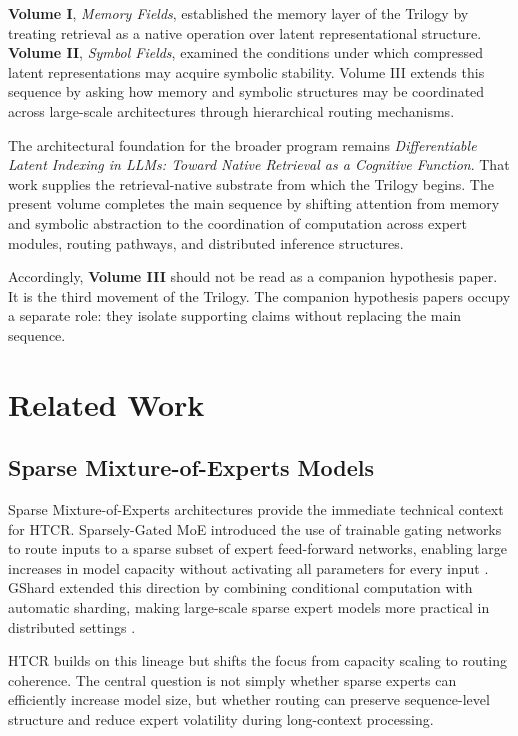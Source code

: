 \textbf{Volume I}, \textit{Memory Fields}, established the memory layer of the Trilogy by treating retrieval as a native operation over latent representational structure. \textbf{Volume II}, \textit{Symbol Fields}, examined the conditions under which compressed latent representations may acquire symbolic stability. Volume III extends this sequence by asking how memory and symbolic structures may be coordinated across large-scale architectures through hierarchical routing mechanisms.

The architectural foundation for the broader program remains \textit{Differentiable Latent Indexing in LLMs: Toward Native Retrieval as a Cognitive Function}. That work supplies the retrieval-native substrate from which the Trilogy begins. The present volume completes the main sequence by shifting attention from memory and symbolic abstraction to the coordination of computation across expert modules, routing pathways, and distributed inference structures.

Accordingly, \textbf{Volume III} should not be read as a companion hypothesis paper. It is the third movement of the Trilogy. The companion hypothesis papers occupy a separate role: they isolate supporting claims without replacing the main sequence.

\chapter{Related Work}

\section{Sparse Mixture-of-Experts Models}

Sparse Mixture-of-Experts architectures provide the immediate technical context for HTCR. Sparsely-Gated MoE introduced the use of trainable gating networks to route inputs to a sparse subset of expert feed-forward networks, enabling large increases in model capacity without activating all parameters for every input \cite{Shazeer2017}. GShard extended this direction by combining conditional computation with automatic sharding, making large-scale sparse expert models more practical in distributed settings \cite{Lepikhin2020}.

HTCR builds on this lineage but shifts the focus from capacity scaling to routing coherence. The central question is not simply whether sparse experts can efficiently increase model size, but whether routing can preserve sequence-level structure and reduce expert volatility during long-context processing.

